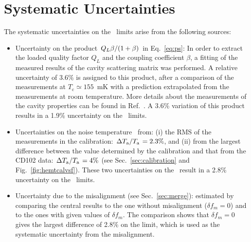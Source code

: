 \section{Systematic Uncertainties} \label{sec:sys}
The systematic uncertainties on the \gagg\ limits arise from the 
following sources:
\begin{itemize}
\item Uncertainty on the product 
$\left.Q_L\beta\middle/\left(1+\beta\right)\right.$ in Eq.~\eqref{eq:ps}: 
In order to extract the loaded quality factor $Q_L$ and the coupling 
coefficient $\beta$, a fitting of the measured results of the cavity 
scattering matrix was performed. A relative uncertainty of 3.6\% is 
assigned to this product, after a comparison of the measurements at 
$T_\text{c}\simeq155$~mK with a prediction extrapolated from the measurements 
at room temperature. More details about the measurements of the 
cavity properties can be found in Ref.~\cite{TASEHInstrumentation}. 
A 3.6\% variation of this product results in a 1.9\% uncertainty 
on the \gagg\ limits. 

\item Uncertainties on the noise temperature \ta\ from: (i) the RMS of 
the measurements in the calibration: 
$\left. \Delta T_\text{a}\middle/T_\text{a}\right.= 2.3\%$,  
%
and (ii) from the largest difference 
between the value determined by the calibration and that from the CD102 
data: $\left. \Delta T_\text{a}\middle/T_\text{a}\right.= 4\%$ 
(see Sec.~\ref{sec:calibration} and Fig.~\ref{fig:hemtcalvsf}). 
These two uncertainties on the \ta\ result in a 2.8\% uncertainty 
on the \gagg\ limits. 

\item Uncertainty due to the misalignment (see Sec.~\ref{sec:merge}):
  estimated by comparing the central results to the one without misalignment
  ($\delta f_m = 0$)
  and to the ones with given values of $\delta f_m$.
  The comparison shows that $\delta f_m = 0$ gives the largest difference 
  of 2.8\% on the limit, which is used as the systematic uncertainty from the 
  misalignment.
  

\end{itemize}
